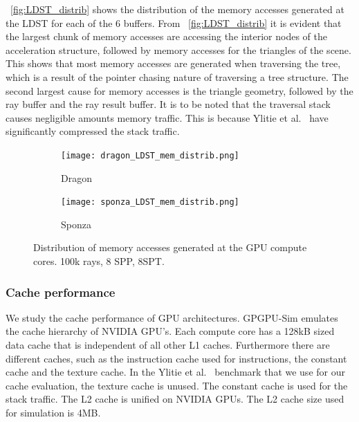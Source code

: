 ~\autoref{fig:LDST_distrib} shows the distribution of the memory accesses generated at the LDST for each of the 6 buffers.
From ~\autoref{fig:LDST_distrib} it is evident that the largest chunk of memory accesses are accessing the interior nodes of the acceleration structure, followed by memory accesses for the triangles of the scene. 
This shows that most memory accesses are generated when traversing the tree, which is a result of the pointer chasing nature of traversing a tree structure. The second largest cause for memory accesses is the triangle geometry, followed by the ray buffer and the ray result buffer. 
It is to be noted that the traversal stack causes negligible amounts memory traffic. This is because Ylitie et al.~\cite{Ylitie:2017:EIR:3105762.3105773} have significantly compressed the stack traffic. 

\begin{figure}[htb]
  \begin{subfigure}{0.49\textwidth}
  \texttt{[image: dragon\_LDST\_mem\_distrib.png]}
  \caption{Dragon}
  \end{subfigure}
  \hspace*{\fill} %
  \begin{subfigure}{0.49\textwidth}
  \texttt{[image: sponza\_LDST\_mem\_distrib.png]}
  \caption{Sponza}
  \end{subfigure}

  \caption{\label{fig:LDST_distrib}
           Distribution of memory accesses generated at the GPU compute cores. 100k rays, 8 SPP, 8SPT.
           }
\end{figure}

\subsubsection{Cache performance}

We study the cache performance of GPU architectures.
GPGPU-Sim emulates the cache hierarchy of NVIDIA GPU's. Each compute core has a 128kB sized data cache that is independent of all other L1 caches. 
Furthermore there are different caches, such as the instruction cache used for instructions, the constant cache and the texture cache. 
In the Ylitie et al.~\cite{Ylitie:2017:EIR:3105762.3105773} benchmark that we use for our cache evaluation, the texture cache is unused. The constant cache is used for the stack traffic. 
The L2 cache is unified on NVIDIA GPUs. The L2 cache size used for simulation is 4MB.

